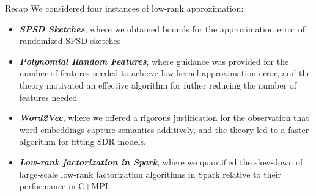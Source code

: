 \documentclass[xcolor=x11names,compress,ignorenonframetext,10pt]{beamer}
\renewcommand{\(}{\begin{columns}}
\renewcommand{\)}{\end{columns}}
\newcommand{\<}[1]{\begin{column}{#1}}
\renewcommand{\>}{\end{column}}
\newcommand{\greenemphasis}[1]{\textbf{\textit{\textcolor{dgreen}{#1}}}}
\begin{document}
\begin{frame}{Recap}
  We considered four instances of low-rank approximation:
  \begin{itemize}
    \item \greenemphasis{SPSD Sketches}, where we obtained bounds for the approximation error of randomized SPSD sketches
    \item \greenemphasis{Polynomial Random Features}, where guidance was
      provided for the number of features needed to achieve low kernel
      approximation error, and the theory motivated an effective algorithm for
      futher reducing the number of features needed 
    \item \greenemphasis{Word2Vec}, where we offered a rigorous justification for the observation that word embeddings capture semantics additively, and 
      the theory led to a faster algorithm for fitting SDR models.
    \item \greenemphasis{Low-rank factorization in Spark}, where we quantified the slow-down of large-scale low-rank factorization algorithms in Spark
      relative to their performance in C+MPI.
  \end{itemize}
\end{frame}
\end{document}
